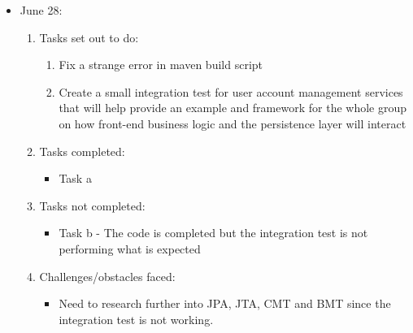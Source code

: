 \documentclass[12pt]{article}
\begin{document}
	\begin{itemize}
		\item June 28:
		\begin{enumerate}
			\item Tasks set out to do:
			\begin{enumerate}
				\item Fix a strange error in maven build script
				\item Create a small integration test for user account management services that will help provide an example and framework for the whole group on how front-end business logic and the persistence layer will interact				
			\end{enumerate}
			\item Tasks completed:
			\begin{itemize}
				\item Task a								
			\end{itemize}
			\item Tasks not completed:
			\begin{itemize}
				\item Task b - The code is completed but the integration test is not performing what is expected
			\end{itemize}
			\item Challenges/obstacles faced:
			\begin{itemize}
				\item Need to research further into JPA, JTA, CMT and BMT since the integration test is not working.
			\end{itemize}			
		\end{enumerate}
	\end{itemize}
\end{document}
